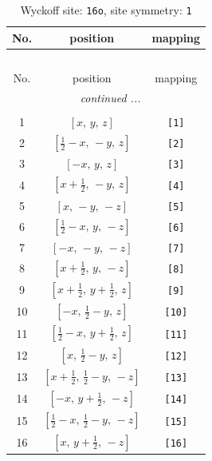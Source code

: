 \documentclass[fleqn,8pt]{jsarticle}
\begin{document}
\begin{longtable}{ccc}
\caption{Wyckoff site: {\tt 16o}, site symmetry: {\tt 1}}
 \\
 \hline \hline
No. & position & mapping \\ \hline \endfirsthead

\multicolumn{2}{l}{\tablename\ \thetable{}} \\
 \hline \hline
No. & position & mapping \\ \hline \endhead

 \hline \hline
\multicolumn{2}{r}{\footnotesize\it continued ...} \\ \endfoot

 \hline \hline
\multicolumn{2}{r}{} \\ \endlastfoot

1 & $\left[ x,\, y,\, z \right]$ & {\tt [1]} \\ \hline
2 & $\left[ \frac{1}{2} - x,\, - y,\, z \right]$ & {\tt [2]} \\ \hline
3 & $\left[ - x,\, y,\, z \right]$ & {\tt [3]} \\ \hline
4 & $\left[ x + \frac{1}{2},\, - y,\, z \right]$ & {\tt [4]} \\ \hline
5 & $\left[ x,\, - y,\, - z \right]$ & {\tt [5]} \\ \hline
6 & $\left[ \frac{1}{2} - x,\, y,\, - z \right]$ & {\tt [6]} \\ \hline
7 & $\left[ - x,\, - y,\, - z \right]$ & {\tt [7]} \\ \hline
8 & $\left[ x + \frac{1}{2},\, y,\, - z \right]$ & {\tt [8]} \\ \hline
9 & $\left[ x + \frac{1}{2},\, y + \frac{1}{2},\, z \right]$ & {\tt [9]} \\ \hline
10 & $\left[ - x,\, \frac{1}{2} - y,\, z \right]$ & {\tt [10]} \\ \hline
11 & $\left[ \frac{1}{2} - x,\, y + \frac{1}{2},\, z \right]$ & {\tt [11]} \\ \hline
12 & $\left[ x,\, \frac{1}{2} - y,\, z \right]$ & {\tt [12]} \\ \hline
13 & $\left[ x + \frac{1}{2},\, \frac{1}{2} - y,\, - z \right]$ & {\tt [13]} \\ \hline
14 & $\left[ - x,\, y + \frac{1}{2},\, - z \right]$ & {\tt [14]} \\ \hline
15 & $\left[ \frac{1}{2} - x,\, \frac{1}{2} - y,\, - z \right]$ & {\tt [15]} \\ \hline
16 & $\left[ x,\, y + \frac{1}{2},\, - z \right]$ & {\tt [16]} \\
\end{longtable}
\end{document}
